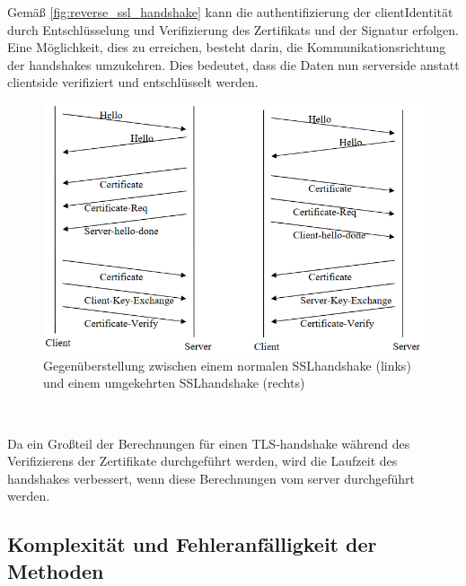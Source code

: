 Gemäß \autoref{fig:reverse_ssl_handshake} kann die \gls{authentifizierung} der \gls{client}\nonbreakdash Identität durch Entschlüsselung und Verifizierung des Zertifikats und der Signatur erfolgen.
Eine Möglichkeit, dies zu erreichen, besteht darin, die Kommunikationsrichtung der \glspl{handshake} umzukehren.
Dies bedeutet, dass die Daten nun serverside anstatt clientside verifiziert und entschlüsselt werden.\autocite[\vglf][]{cryptoeprint:2006/212}
\begin{figure}[htpb]
    \centering
    \includegraphics[width=0.75\linewidth]{src/abbildungen/reverse_ssl_handshake}
    \caption[Gegenüberstellung zwischen einem normalen SSL-Handshake und einem umgekehrten SSL-Handshake ]{Gegenüberstellung zwischen einem normalen \ac{SSL}\nonbreakdash\gls{handshake} (links) und einem umgekehrten \ac{SSL}\nonbreakdash\gls{handshake} (rechts)\footnotemark}
    \label{fig:reverse_ssl_handshake}
\end{figure}~

Da ein Großteil der Berechnungen für einen \ac{TLS}-\gls{handshake} während des Verifizierens der Zertifikate durchgeführt werden, wird die Laufzeit des \glspl{handshake} verbessert, wenn diese Berechnungen vom \gls{server} durchgeführt werden.

\subsection[Komplexität und Fehleranfälligkeit der Kryptografischen Methoden]{Komplexität und Fehleranfälligkeit der  Methoden}\label{subsec:komplexitaet_und_fehleranfaelligkeit_der_kryptografie}

